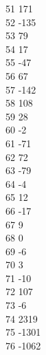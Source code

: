 { 51	171 \\
 52	-135 \\
 53	79 \\
 54	17 \\
 55	-47 \\
 56	67 \\
 57	-142 \\
 58	108 \\
 59	28 \\
 60	-2 \\
 61	-71 \\
 62	72 \\
 63	-79 \\
 64	-4 \\
 65	12 \\
 66	-17 \\
 67	9 \\
 68	0 \\
 69	-6 \\
 70	3 \\
 71	-10 \\
 72	107 \\
 73	-6 \\
 74	2319 \\
 75	-1301 \\
 76	-1062 \\
}
